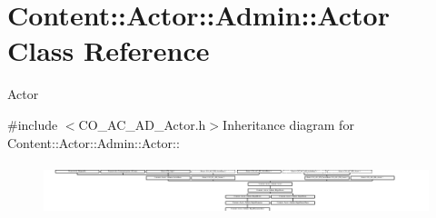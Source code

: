 \hypertarget{classContent_1_1Actor_1_1Admin_1_1Actor}{
\section{Content::Actor::Admin::Actor Class Reference}
\label{classContent_1_1Actor_1_1Admin_1_1Actor}
}


Actor  


{\ttfamily \#include $<$CO\_\-AC\_\-AD\_\-Actor.h$>$}Inheritance diagram for Content::Actor::Admin::Actor::\begin{figure}[H]
\begin{center}
\leavevmode
\includegraphics[height=1.50307cm]{classContent_1_1Actor_1_1Admin_1_1Actor}
\end{center}
\end{figure}
